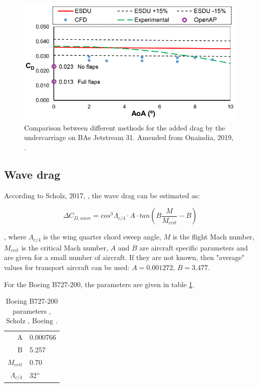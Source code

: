 \documentclass[english]{kththesis}
\begin{document}
\begin{figure}[hb]
    \centering
    \includegraphics[width=1\textwidth]{Epictures/BAe Jetstream 31 Gear Drag.png}
    \caption{Comparison between different methods for the added drag by the undercarriage on BAe Jetstream 31. Amended from Onaindia, 2019, \cite{Onaindia2019}.}
    \label{fig:BAeJ31Compare}
\end{figure}

\clearpage

\subsection{Wave drag}
\label{sec:wavedrag}
According to Scholz, 2017, \cite{Scholz2017}, the wave drag can be estimated as:

\begin{equation}
\label{eq:CDwaveScholz}
\Delta C_{D,wave} = cos^3 \Lambda_{c/4} \cdot A \cdot tan \left( B \frac{M}{M_{crit}} - B \right)
\end{equation}

, where $\Lambda_{c/4}$ is the wing quarter chord sweep angle, $M$ is the flight Mach number, $M_{crit}$ is the critical Mach number, $A$ and $B$ are aircraft specific parameters and are given for a small number of aircraft. If they are not known, then "average" values for transport aircraft can be used: $A = 0.001272$, $B = 3.477$.

For the Boeing B727-200, the parameters are given in table \ref{table:B727Param}.

\begin{table}[h!]
\centering
\caption{Boeing B727-200 parameters , Scholz \cite{Scholz2017}, Boeing \cite{Boeing727-2007}.}
\begin{tabular}{ r l } 
\hline
A & 0.000766\\
B & 5.257\\
$M_{crit}$ & 0.70\\
$\Lambda_{c/4}$ & 32$\degree$\\
\hline
\end{tabular}
\label{table:B727Param}
\end{table}
\end{document}
